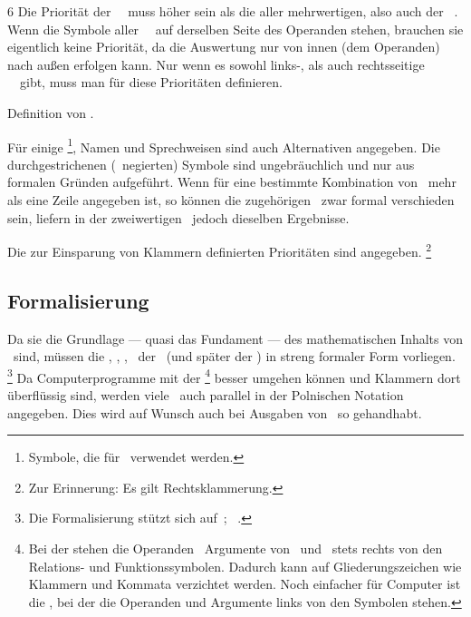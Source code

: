 \begin{table}[p]
\begin{threeparttable}
\begin{tablenotes}
			\item[6] Die Priorität der \unaeren\ \Operationen\ muss höher sein als die aller mehrwertigen, also auch der \binaeren\ \Operationen.
			Wenn die Symbole aller \unaeren\ \Operationen\ auf derselben Seite des Operanden stehen, brauchen sie eigentlich keine Priorität, da die Auswertung nur von innen (dem Operanden) nach außen erfolgen kann.
			Nur wenn es sowohl links-, als auch rechtsseitige \unaere\ \Operationen\ gibt, muss man für diese Prioritäten definieren.
		\end{tablenotes}
	\end{threeparttable}
	\caption{Definition von \aussagenlogischenSymbolen.}
	\label{tab-Symbole}%
\end{table}

Für einige \Junktorsymbole%
\footnote{%
	Symbole, die für \Junktoren\ verwendet werden.
},
Namen und Sprechweisen sind auch Alternativen angegeben.
Die durchgestrichenen (\textdh\ negierten) Symbole sind ungebräuchlich und nur aus formalen Gründen aufgeführt.
Wenn für eine bestimmte Kombination von \Wahrheitswerten\ mehr als eine Zeile angegeben ist, so können die zugehörigen \Junktoren\ zwar formal verschieden sein, liefern in der zweiwertigen \Aussagenlogik\ jedoch dieselben Ergebnisse.

Die zur Einsparung von Klammern definierten Prioritäten sind  angegeben.%
\footnote{Zur Erinnerung: Es gilt Rechtsklammerung. }

\subsection{Formalisierung}%
\label {sub-Formalisierung}

Da sie die Grundlage --- quasi das Fundament --- des mathematischen Inhalts von \ASBA\ sind, müssen die \Axiome, \Saetze, \Beweise, \textusw\ der \Aussagenlogik\ (und später der \Praedikatenlogik) in streng formaler Form vorliegen.%
\footnote{%
	Die Formalisierung stützt sich auf~\cite{bib:AussagenlogikFormalerZugang}; \alsoname~\cite{bib:LogikDe, bib:LogikEn}.
}
Da Computerprogramme mit der \emph{\PolnischenNotation}%
\footnote{%
	Bei der  stehen die Operanden \textbzw\ Argumente von \Relationen\ und \Funktionen\ stets rechts von den Relations- und Funktionssymbolen.
	Dadurch kann auf Gliederungszeichen wie Klammern und Kommata verzichtet werden.
	Noch einfacher für Computer ist die , bei der die Operanden und Argumente links von den Symbolen stehen.
}
besser umgehen können und Klammern dort überflüssig sind, werden viele \Formeln\ auch parallel in der Polnischen Notation angegeben.
Dies wird auf Wunsch auch bei Ausgaben von \ASBA\ so gehandhabt.

